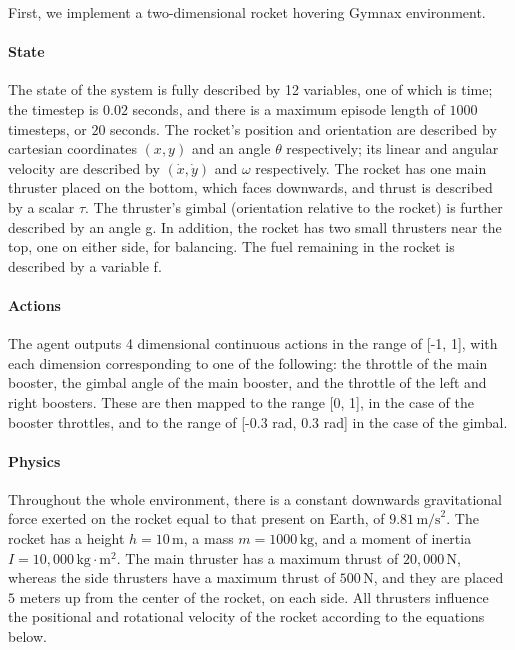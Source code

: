 \documentclass{article}
\begin{document}

First, we implement a two-dimensional rocket hovering Gymnax environment.

\paragraph{State}

The state of the system is fully described by 12 variables, one of which is time; the timestep is $0.02$ seconds, and there is a maximum episode length of $1000$ timesteps, or $20$ seconds. The rocket's position and orientation are described by cartesian coordinates $(x, y)$ and an angle $\theta$ respectively; its linear and angular velocity are described by $(\dot x, \dot y)$ and $\omega$ respectively.
The rocket has one main thruster placed on the bottom, which faces downwards, and thrust is described by a scalar $\tau$. The thruster's gimbal (orientation relative to the rocket) is further described by an angle g. In addition, the rocket has two small thrusters near the top, one on either side, for balancing. The fuel remaining in the rocket is described by a variable f.

\paragraph{Actions}

The agent outputs 4 dimensional continuous actions in the range of [-1, 1], with each dimension corresponding to one of the following: the throttle of the main booster, the gimbal angle of the main booster, and the throttle of the left and right boosters. These are then mapped to the range [0, 1], in the case of the booster throttles, and to the range of [-0.3 rad, 0.3 rad] in the case of the gimbal.

\paragraph{Physics}

Throughout the whole environment, there is a constant downwards gravitational force exerted on the rocket equal to that present on Earth, of $9.81\,\text{m/s}^2$.
The rocket has a height $h = 10\,\text{m}$, a mass $m = 1000\,\text{kg}$, and a moment of inertia $I = 10{,}000\,\text{kg}\!\cdot\!\text{m}^2$. The main thruster has a maximum thrust of $20{,}000\,\text{N}$, whereas the side thrusters have a maximum thrust of $500\,\text{N}$, and they are placed $5$ meters up from the center of the rocket, on each side. All thrusters influence the positional and rotational velocity of the rocket according to the equations below.
\end{document}
